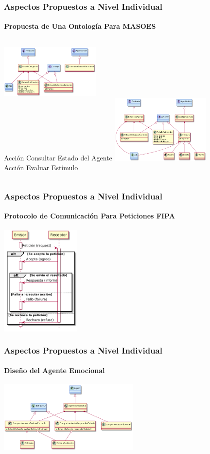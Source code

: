 \documentclass{beamer}
\begin{document}
\begin{frame}
\frametitle{Aspectos Propuestos a Nivel Individual}
\framesubtitle{Propuesta de Una Ontología Para MASOES}
\begin{columns}
\centering
\tiny
\includegraphics[width=5cm]{ilustraciones/ontologia-masoes-estado}
\\
Acción Consultar Estado del Agente
\centering
\tiny
\includegraphics[width=5cm]{ilustraciones/ontologia-masoes-estimulo}
\\
Acción Evaluar Estímulo
\end{columns}
\end{frame}

\begin{frame}
\frametitle{Aspectos Propuestos a Nivel Individual}
\framesubtitle{Protocolo de Comunicación Para Peticiones FIPA}
\centering
\includegraphics[width=4cm]{ilustraciones/flujo-fipa-protocolo-request}
\end{frame}

\begin{frame}
\frametitle{Aspectos Propuestos a Nivel Individual}
\framesubtitle{Diseño del Agente Emocional}
\centering
\includegraphics[width=7cm]{ilustraciones/diseno-nivel-individual}
\end{frame}
\end{document}
